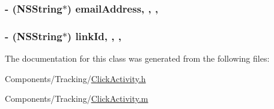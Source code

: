 \hypertarget{interface_click_activity_ac23f733678933938130fc10f72288911}{
\subsubsection[{email\-Address}]{\setlength{\rightskip}{0pt plus 5cm}-\/ (N\-S\-String$\ast$) email\-Address\hspace{0.3cm}{\ttfamily [read]}, {\ttfamily [write]}, {\ttfamily [nonatomic]}, {\ttfamily [strong]}}}\label{interface_click_activity_ac23f733678933938130fc10f72288911}
\hypertarget{interface_click_activity_a19803f5ea19ba2bcef1842d19886373c}{
\subsubsection[{link\-Id}]{\setlength{\rightskip}{0pt plus 5cm}-\/ (N\-S\-String$\ast$) link\-Id\hspace{0.3cm}{\ttfamily [read]}, {\ttfamily [write]}, {\ttfamily [nonatomic]}, {\ttfamily [strong]}}}\label{interface_click_activity_a19803f5ea19ba2bcef1842d19886373c}


The documentation for this class was generated from the following files\-:\begin{DoxyCompactItemize}
\item 
Components/\-Tracking/\hyperlink{_click_activity_8h}{Click\-Activity.\-h}\item 
Components/\-Tracking/\hyperlink{_click_activity_8m}{Click\-Activity.\-m}\end{DoxyCompactItemize}
